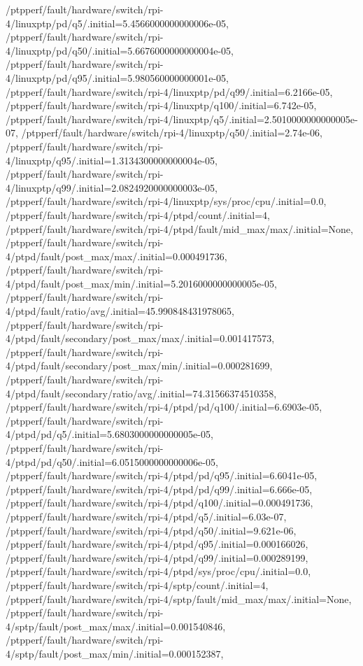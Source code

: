 {    /ptpperf/fault/hardware/switch/rpi-4/linuxptp/pd/q5/.initial=5.4566000000000006e-05,
    /ptpperf/fault/hardware/switch/rpi-4/linuxptp/pd/q50/.initial=5.6676000000000004e-05,
    /ptpperf/fault/hardware/switch/rpi-4/linuxptp/pd/q95/.initial=5.980560000000001e-05,
    /ptpperf/fault/hardware/switch/rpi-4/linuxptp/pd/q99/.initial=6.2166e-05,
    /ptpperf/fault/hardware/switch/rpi-4/linuxptp/q100/.initial=6.742e-05,
    /ptpperf/fault/hardware/switch/rpi-4/linuxptp/q5/.initial=2.5010000000000005e-07,
    /ptpperf/fault/hardware/switch/rpi-4/linuxptp/q50/.initial=2.74e-06,
    /ptpperf/fault/hardware/switch/rpi-4/linuxptp/q95/.initial=1.3134300000000004e-05,
    /ptpperf/fault/hardware/switch/rpi-4/linuxptp/q99/.initial=2.0824920000000003e-05,
    /ptpperf/fault/hardware/switch/rpi-4/linuxptp/sys/proc/cpu/.initial=0.0,
    /ptpperf/fault/hardware/switch/rpi-4/ptpd/count/.initial=4,
    /ptpperf/fault/hardware/switch/rpi-4/ptpd/fault/mid_max/max/.initial=None,
    /ptpperf/fault/hardware/switch/rpi-4/ptpd/fault/post_max/max/.initial=0.000491736,
    /ptpperf/fault/hardware/switch/rpi-4/ptpd/fault/post_max/min/.initial=5.2016000000000005e-05,
    /ptpperf/fault/hardware/switch/rpi-4/ptpd/fault/ratio/avg/.initial=45.990848431978065,
    /ptpperf/fault/hardware/switch/rpi-4/ptpd/fault/secondary/post_max/max/.initial=0.001417573,
    /ptpperf/fault/hardware/switch/rpi-4/ptpd/fault/secondary/post_max/min/.initial=0.000281699,
    /ptpperf/fault/hardware/switch/rpi-4/ptpd/fault/secondary/ratio/avg/.initial=74.31566374510358,
    /ptpperf/fault/hardware/switch/rpi-4/ptpd/pd/q100/.initial=6.6903e-05,
    /ptpperf/fault/hardware/switch/rpi-4/ptpd/pd/q5/.initial=5.6803000000000005e-05,
    /ptpperf/fault/hardware/switch/rpi-4/ptpd/pd/q50/.initial=6.0515000000000006e-05,
    /ptpperf/fault/hardware/switch/rpi-4/ptpd/pd/q95/.initial=6.6041e-05,
    /ptpperf/fault/hardware/switch/rpi-4/ptpd/pd/q99/.initial=6.666e-05,
    /ptpperf/fault/hardware/switch/rpi-4/ptpd/q100/.initial=0.000491736,
    /ptpperf/fault/hardware/switch/rpi-4/ptpd/q5/.initial=6.03e-07,
    /ptpperf/fault/hardware/switch/rpi-4/ptpd/q50/.initial=9.621e-06,
    /ptpperf/fault/hardware/switch/rpi-4/ptpd/q95/.initial=0.000166026,
    /ptpperf/fault/hardware/switch/rpi-4/ptpd/q99/.initial=0.000289199,
    /ptpperf/fault/hardware/switch/rpi-4/ptpd/sys/proc/cpu/.initial=0.0,
    /ptpperf/fault/hardware/switch/rpi-4/sptp/count/.initial=4,
    /ptpperf/fault/hardware/switch/rpi-4/sptp/fault/mid_max/max/.initial=None,
    /ptpperf/fault/hardware/switch/rpi-4/sptp/fault/post_max/max/.initial=0.001540846,
    /ptpperf/fault/hardware/switch/rpi-4/sptp/fault/post_max/min/.initial=0.000152387,
}
